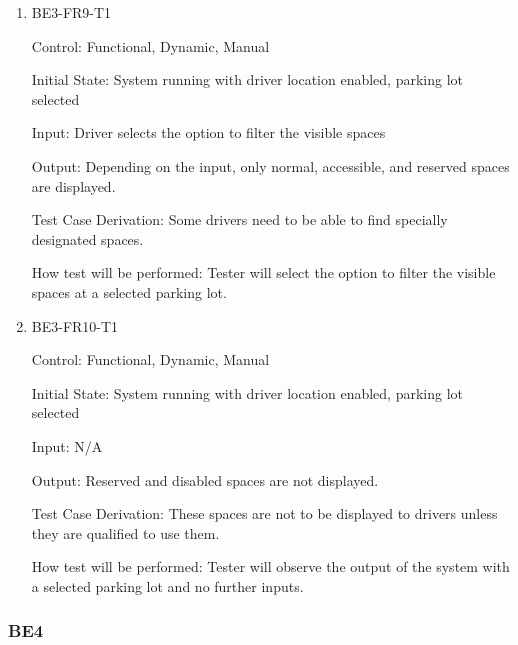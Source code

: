 \documentclass[12pt, titlepage]{article}
\begin{document}
\begin{enumerate}

\item{BE3-FR9-T1}

Control: Functional, Dynamic, Manual
					
Initial State: System running with driver location enabled, parking lot selected
					
Input: Driver selects the option to filter the visible spaces
					
Output: Depending on the input, only normal, accessible, and reserved spaces are
displayed.

Test Case Derivation: Some drivers need to be able to find specially designated
spaces.
					
How test will be performed: Tester will select the option to filter the visible
spaces at a selected parking lot.

\item{BE3-FR10-T1}

Control: Functional, Dynamic, Manual
					
Initial State: System running with driver location enabled, parking lot selected
					
Input: N/A
					
Output: Reserved and disabled spaces are not displayed.

Test Case Derivation: These spaces are not to be displayed to drivers unless
they are qualified to use them.
					
How test will be performed: Tester will observe the output of the system with a
selected parking lot and no further inputs.

\end{enumerate}

\subsubsection{BE4}
\end{document}
